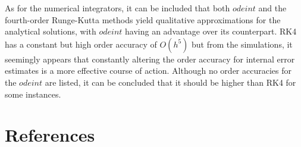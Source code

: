 \documentclass[12pt]{article}
\begin{document}
As for the numerical integrators, it can be included that both $odeint$ and 
the fourth-order Runge-Kutta methods yield qualitative approximations for the 
analytical solutions, with $odeint$ having an advantage over its counterpart. 
RK4 has a constant but high order accuracy of $O(h^5)$ but from the simulations, 
it seemingly appears that constantly altering the order accuracy for internal 
error estimates is a more effective course of action. Although no order accuracies 
for the $odeint$ are listed, it can be concluded that it should be higher than 
RK4 for some instances.
 
\newpage 
\section{References}
\printbibliography[heading=none]
\end{document}
